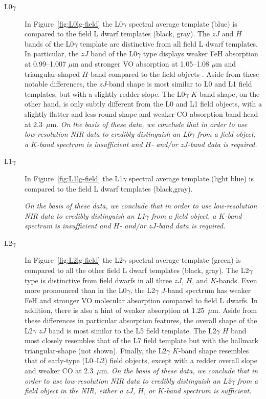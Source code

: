 \documentclass[12pt,preprint]{aastex}
\begin{document}
\begin{description}
\item[L0$\gamma$]{
In Figure~\ref{fig:L0lg-field} the L0$\gamma$ spectral average template (blue) is compared to the field L dwarf templates (black, gray).  
The $zJ$ and $H$ bands of the L0$\gamma$ template are distinctive from all field L dwarf templates. 
In particular, the $zJ$ band of the L0$\gamma$ type displays weaker FeH absorption at 0.99--1.007 $\mu$m and stronger VO absorption at 1.05--1.08 $\mu$m and triangular-shaped $H$ band compared to the field objects \citep{Kirkpatrick06}. 
Aside from these notable differences, the $zJ$-band shape is most similar to L0 and L1 field templates, but with a slightly redder slope. 
The L0$\gamma$ $K$-band shape, on the other hand, is only subtly different from the L0 and L1 field objects, with a slightly flatter and less round shape and weaker CO absorption band head at 2.3~$\mu$m. 
\emph{On the basis of these data, we conclude that in order to use low-resolution NIR data to credibly distinguish an L0$\gamma$ from a field object, a $K$-band spectrum is insufficient and $H$- and/or $zJ$-band data is required.}
}

\item[L1$\gamma$]{
In Figure~\ref{fig:L1lg-field} the L1$\gamma$ spectral average template (light blue) is compared to the field L dwarf templates (black,gray).

\emph{On the basis of these data, we conclude that in order to use low-resolution NIR data to credibly distinguish an L1$\gamma$ from a field object, a $K$-band spectrum is insufficient and $H$- and/or $zJ$-band data is required.}

}

\item[L2$\gamma$]{
In Figure~\ref{fig:L2lg-field} the L2$\gamma$ spectral average template (green) is compared to all the other field L dwarf templates (black, gray). 
The L2$\gamma$ type is distinctive from field dwarfs in all three $zJ$, $H$, and $K$-bands. 
Even more pronounced than in the L0$\gamma$, the L2$\gamma$ $J$-band spectrum has weaker FeH and stronger VO molecular absorption compared to field L dwarfs. 
In addition, there is also a hint of weaker  absorption at 1.25~$\mu$m. Aside from these differences in particular absorption features, the overall shape of the L2$\gamma$ $zJ$ band is most similar to the L5 field template.
The L2$\gamma$ $H$ band most closely resembles that of the L7 field template but with the hallmark  triangular-shape (not shown). 
Finally, the L2$\gamma$ $K$-band shape resembles that of early-type (L0--L2) field objects, except with a redder overall slope and weaker CO at 2.3~$\mu$m. 
\emph{On the basis of these data, we conclude that in order to use low-resolution NIR data to credibly distinguish an L2$\gamma$ from a field object in the NIR, either a $zJ$, $H$, or $K$-band spectrum is sufficient.}
}


\end{description}
\end{document}
